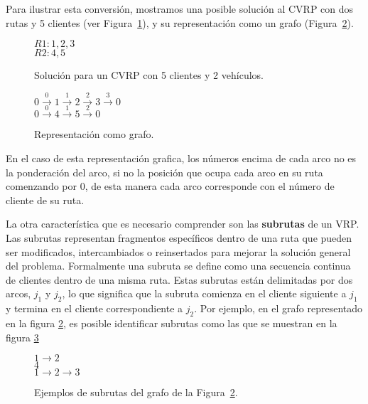 \documentclass{article}
\begin{document}
Para ilustrar esta conversión, mostramos una posible solución al CVRP con dos rutas y 5 clientes (ver Figura~\ref{fig:solucion-cvrp}), y su representación como un grafo (Figura~\ref{fig:grafo-cvrp}).

\begin{figure}[h!]
$R1: 1,2,3$\\
$R2: 4,5$
    \caption{Solución para un CVRP con 5 clientes y 2 vehículos.}
    \label{fig:solucion-cvrp}
\end{figure}

\begin{figure}[h!]
$0 \overset{0}{\rightarrow}1 \overset{1}{\rightarrow}2 \overset{2}{\rightarrow}3 \overset{3}{\rightarrow}0$\\
$0 \overset{0}{\rightarrow}4 \overset{1}{\rightarrow}5 \overset{2}{\rightarrow}0$

    \caption{Representación como grafo.}
    \label{fig:grafo-cvrp}
\end{figure}

En el caso de esta representación grafica, los números encima de cada arco no es la ponderación del arco, si no la posición que ocupa cada arco en su ruta comenzando por 0, de esta manera cada arco corresponde con el número de cliente de su ruta.

La otra característica que es necesario comprender son las \textbf{subrutas} de un VRP. Las subrutas representan fragmentos específicos dentro de una ruta que pueden ser modificados, intercambiados o reinsertados para mejorar la solución general del problema. Formalmente una subruta se define como una secuencia continua de clientes dentro de una misma ruta. Estas subrutas están delimitadas por dos arcos, $j_1$ y $j_2$, lo que significa que la subruta comienza en el cliente siguiente a $j_1$ y termina en el cliente correspondiente a $j_2$. Por ejemplo, en el grafo representado en la figura \ref{fig:grafo-cvrp}, es posible identificar subrutas como las que se muestran en la figura \ref{fig:subrutas-cvrp}

\begin{figure}[h!]
$1 \rightarrow2$\\
$4$\\
$1 \rightarrow2 \rightarrow3 $
    \caption{Ejemplos de subrutas del grafo de la Figura~\ref{fig:grafo-cvrp}.}
    \label{fig:subrutas-cvrp}
\end{figure}
\end{document}
